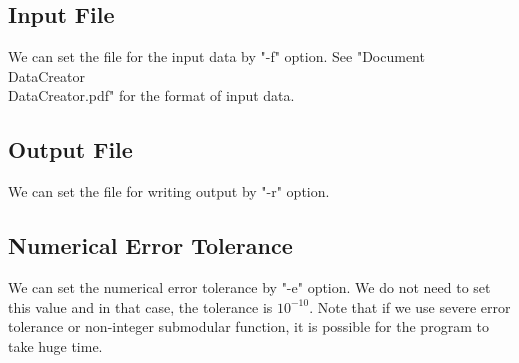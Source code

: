 \documentclass{article}
\begin{document}
\subsection{Input File}
We can set the file for the input data by "-f" option.
See "Document\\DataCreator\\DataCreator.pdf" for the format of input data.

\subsection{Output File}
We can set the file for writing output by "-r" option.


\subsection{Numerical Error Tolerance}
We can set the numerical error tolerance by "-e" option.
We do not need to set this value and in that case,
the tolerance is $10^{-10}$.
Note that if we use severe error tolerance or non-integer submodular function,
it is possible for the program to take huge time.
\end{document}
